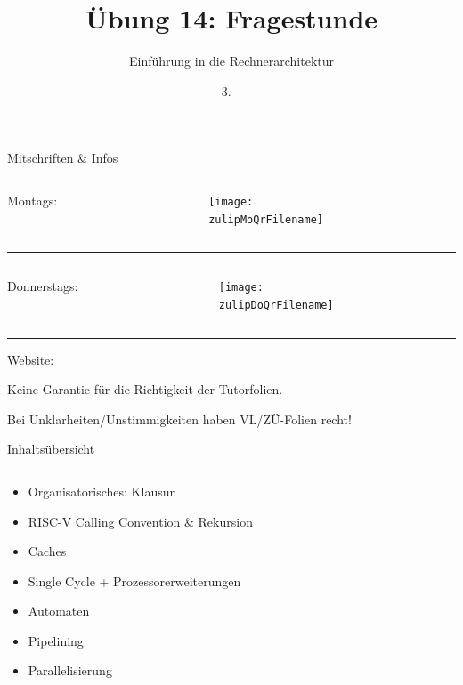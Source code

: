 \documentclass[
  german,            %
  aspectratio=169,    %
]{tumbeamer}
\title{Übung 14: Fragestunde}
\subtitle{Einführung in die Rechnerarchitektur}
\author{\theAuthorName}
\institute{\theGroupName\\\theSchoolName\\\theUniversityName}
\date{3. -- \DTMdisplaydate{2025}{02}{9}{-1}}
\begin{document}
\maketitle

\begin{frame}[c]{Mitschriften \& Infos}{}
  \begin{minipage}[t]{\textwidth}
    \begin{columns}[c]
      \begin{column}{0.8\textwidth}
        Montags: \href{\zulipMo}{\zulipMo}
      \end{column}
      \begin{column}{0.2\textwidth}
        \texttt{[image: \\zulipMoQrFilename]}
      \end{column}
    \end{columns}
  \end{minipage}
  \rule{\textwidth}{0.4pt}
  \begin{minipage}[t]{\textwidth}
    \begin{columns}[c]
      \begin{column}{0.8\textwidth}
        Donnerstags: \href{\zulipDo}{\zulipDo}
      \end{column}
      \begin{column}{0.2\textwidth}
        \texttt{[image: \\zulipDoQrFilename]}
      \end{column}
    \end{columns}
  \end{minipage}
  \ifdefined\myWebsite
  \rule{\textwidth}{0.4pt}
  \centering
  Website: \href{\myWebsite}{\myWebsite}
  \fi
\end{frame}

\begin{frame}[c]{}{}
  \begin{center}
    \LARGE  Keine Garantie für die Richtigkeit der Tutorfolien.

    \Large Bei Unklarheiten/Unstimmigkeiten haben VL/ZÜ-Folien recht!
  \end{center}
\end{frame}

\begin{frame}[c]{Inhaltsübersicht}{}
  \begin{columns}[c]
    \begin{column}{1\textwidth}
      \begin{itemize}
		\item Organisatorisches: Klausur
		\item RISC-V Calling Convention \& Rekursion
		\item Caches
		\item Single Cycle + Prozessorerweiterungen
		\item Automaten
		\item Pipelining
		\item Parallelisierung
      \end{itemize}
    \end{column}
  \end{columns}
\end{frame}
\end{document}
